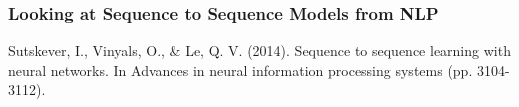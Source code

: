 \begin{frame}[t]
\frametitle{Looking at Sequence to Sequence Models from NLP}

\begin{center}
	
\end{center}
%	
%	


{\small
	Sutskever, I., Vinyals, O., \& Le, Q. V. (2014). Sequence to sequence learning with neural networks. In Advances in neural information processing systems (pp. 3104-3112).}


\end{frame}

